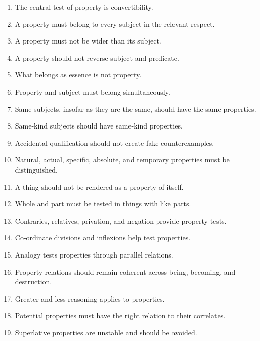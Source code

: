 \documentclass[12pt]{article}
\begin{document}
\begin{enumerate}[itemsep=0.5em]
    \item The central test of property is convertibility.

    \item A property must belong to every subject in the relevant respect.

    \item A property must not be wider than its subject.

    \item A property should not reverse subject and predicate.

    \item What belongs as essence is not property.

    \item Property and subject must belong simultaneously.

    \item Same subjects, insofar as they are the same, should have the same
    properties.

    \item Same-kind subjects should have same-kind properties.

    \item Accidental qualification should not create fake counterexamples.

    \item Natural, actual, specific, absolute, and temporary properties must be
    distinguished.

    \item A thing should not be rendered as a property of itself.

    \item Whole and part must be tested in things with like parts.

    \item Contraries, relatives, privation, and negation provide property tests.

    \item Co-ordinate divisions and inflexions help test properties.

    \item Analogy tests properties through parallel relations.

    \item Property relations should remain coherent across being, becoming, and
    destruction.

    \item Greater-and-less reasoning applies to properties.

    \item Potential properties must have the right relation to their correlates.

    \item Superlative properties are unstable and should be avoided.
\end{enumerate}
\end{document}
